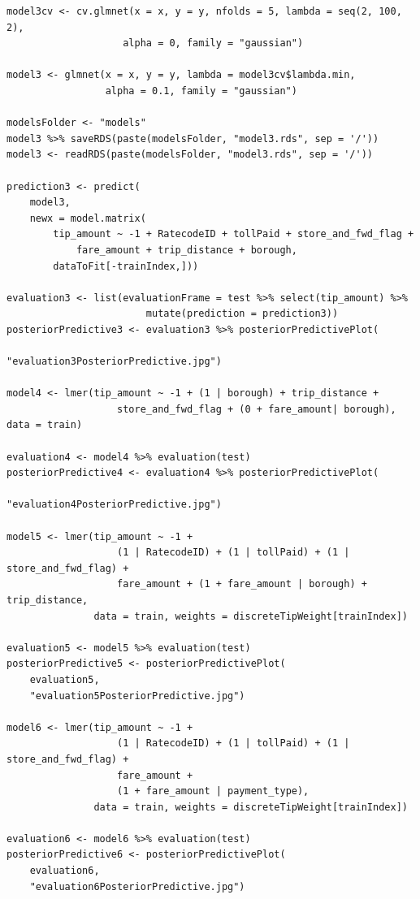 \documentclass[11pt]{article}
\begin{document}
\begin{verbatim}
model3cv <- cv.glmnet(x = x, y = y, nfolds = 5, lambda = seq(2, 100, 2),
                    alpha = 0, family = "gaussian")

model3 <- glmnet(x = x, y = y, lambda = model3cv$lambda.min,
                 alpha = 0.1, family = "gaussian")

modelsFolder <- "models"
model3 %>% saveRDS(paste(modelsFolder, "model3.rds", sep = '/'))
model3 <- readRDS(paste(modelsFolder, "model3.rds", sep = '/'))

prediction3 <- predict(
    model3,
    newx = model.matrix(
        tip_amount ~ -1 + RatecodeID + tollPaid + store_and_fwd_flag +
            fare_amount + trip_distance + borough,
        dataToFit[-trainIndex,]))

evaluation3 <- list(evaluationFrame = test %>% select(tip_amount) %>%
                        mutate(prediction = prediction3))
posteriorPredictive3 <- evaluation3 %>% posteriorPredictivePlot(
                                            "evaluation3PosteriorPredictive.jpg")

model4 <- lmer(tip_amount ~ -1 + (1 | borough) + trip_distance +
                   store_and_fwd_flag + (0 + fare_amount| borough), data = train)

evaluation4 <- model4 %>% evaluation(test)
posteriorPredictive4 <- evaluation4 %>% posteriorPredictivePlot(
                                            "evaluation4PosteriorPredictive.jpg")

model5 <- lmer(tip_amount ~ -1 +
                   (1 | RatecodeID) + (1 | tollPaid) + (1 | store_and_fwd_flag) +
                   fare_amount + (1 + fare_amount | borough) + trip_distance,
               data = train, weights = discreteTipWeight[trainIndex])

evaluation5 <- model5 %>% evaluation(test)
posteriorPredictive5 <- posteriorPredictivePlot(
    evaluation5,
    "evaluation5PosteriorPredictive.jpg")

model6 <- lmer(tip_amount ~ -1 +
                   (1 | RatecodeID) + (1 | tollPaid) + (1 | store_and_fwd_flag) +
                   fare_amount +
                   (1 + fare_amount | payment_type),
               data = train, weights = discreteTipWeight[trainIndex])

evaluation6 <- model6 %>% evaluation(test)
posteriorPredictive6 <- posteriorPredictivePlot(
    evaluation6,
    "evaluation6PosteriorPredictive.jpg")

\end{verbatim}
\end{document}
